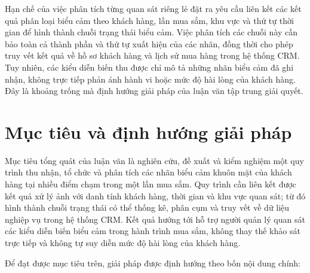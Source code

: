 \documentclass[../LuanVan.tex]{subfiles}
\begin{document}
Hạn chế của việc phân tích từng quan sát riêng lẻ đặt ra yêu cầu liên kết các kết quả phân loại biểu cảm theo khách hàng, lần mua sắm, khu vực và thứ tự thời gian để hình thành chuỗi trạng thái biểu cảm. Việc phân tích các chuỗi này cần bảo toàn cả thành phần và thứ tự xuất hiện của các nhãn, đồng thời cho phép truy vết kết quả về hồ sơ khách hàng và lịch sử mua hàng trong hệ thống CRM. Tuy nhiên, các kiểu diễn biến thu được chỉ mô tả những nhãn biểu cảm đã ghi nhận, không trực tiếp phản ánh hành vi hoặc mức độ hài lòng của khách hàng. Đây là khoảng trống mà định hướng giải pháp của luận văn tập trung giải quyết.

\section{Mục tiêu và định hướng giải pháp}
\label{section:1.2}

Mục tiêu tổng quát của luận văn là nghiên cứu, đề xuất và kiểm nghiệm một quy trình thu nhận, tổ chức và phân tích các nhãn biểu cảm khuôn mặt của khách hàng tại nhiều điểm chạm trong một lần mua sắm. Quy trình cần liên kết được kết quả xử lý ảnh với danh tính khách hàng, thời gian và khu vực quan sát; từ đó hình thành chuỗi trạng thái có thể thống kê, phân cụm và truy vết về dữ liệu nghiệp vụ trong hệ thống CRM. Kết quả hướng tới hỗ trợ người quản lý quan sát các kiểu diễn biến biểu cảm trong hành trình mua sắm, không thay thế khảo sát trực tiếp và không tự suy diễn mức độ hài lòng của khách hàng.

Để đạt được mục tiêu trên, giải pháp được định hướng theo bốn nội dung chính:
\end{document}
